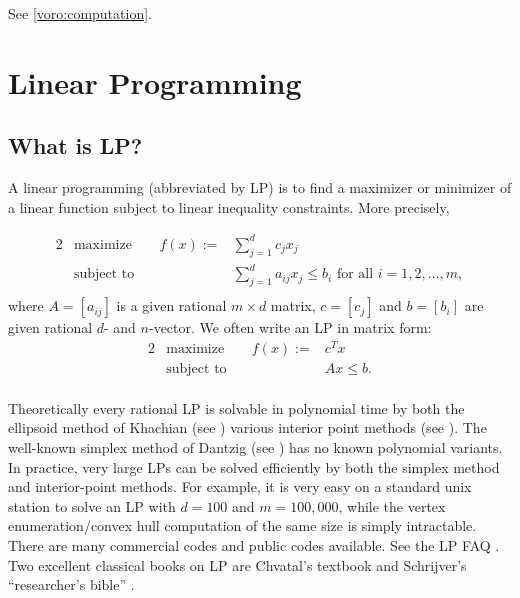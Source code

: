 \documentclass[[a4paper,12pt]{article}
\begin{document}
See  \ref{voro:computation}.


\section{Linear Programming} \label{Sec:LP}

\subsection{What is LP?} \label{LP:def}

A linear programming (abbreviated by LP) is to find a maximizer or
minimizer of a linear function subject to linear inequality constraints.
More precisely, 

\begin{alignat}{2}
&\text{maximize}  
  & \quad f(x) :=  & \sum_{j=1}^d c_j x_j   \label{eq:LP} \\
&\text{subject to}  
  &                & \sum_{j=1}^{d}  a_{ij} x_j \le b_i \text{ for all }  i=1,2,\ldots, m, \\  \nonumber
\end{alignat}
where $A=[a_{ij}]$ is a given rational $m\times d$ matrix, 
$c=[c_j] $ and $b=[b_i]$ are given rational $d$- and $n$-vector.
We often write an LP in matrix form:
\begin{alignat}{2}
&\text{maximize} 
  & \quad f(x) :=  & c^T x   \label{eq:LPmat} \\
&\text{subject to}  
  &                        & A  x \le b. \\  \nonumber
\end{alignat}

Theoretically every rational
LP is solvable in polynomial time by both the ellipsoid method of Khachian
(see \cite{k-palp-79,s-tlip-86})
various interior point methods (see \cite{k-nptal-84,rtv-talpip-97}).
The well-known simplex method of Dantzig (see \cite{d-lpe-63,c-lp-83})
has no known polynomial variants.  In practice,
very large LPs can be solved efficiently 
by both the simplex method and interior-point
methods.  
For example, it is very easy on a standard unix station to solve an LP with
$d=100$ and $m=100,000$, while the vertex enumeration/convex hull
computation of the same size is simply intractable.
There are many commercial codes and public codes available.
See the LP FAQ \cite{fg-lpfaq}.  Two excellent classical books on LP are
Chvatal's textbook \cite{c-lp-83} and Schrijver's 
``researcher's bible'' \cite{s-tlip-86}.
\end{document}
